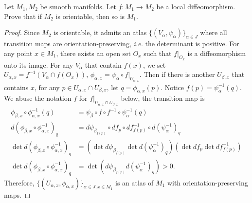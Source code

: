 \documentclass[12pt]{article}
\begin{document}
\begin{problem}[do Carmo 0.8]
Let $ M_1,M_2$ be smooth manifolds. Let $ f: M_1 \to M_2$ be a local diffeomorphism. Prove that if $ M_2$ is orientable, then so is $ M_1$.
\end{problem}
\begin{proof}
Since $ M_2$ is orientable, it admits an atlas $ \{(V_{ \alpha},\psi_{ \alpha})\}_{ \alpha \in J} $ where all transition maps are orientation-preserving, \emph{i.e.} the determinant is positive. For any point $x \in M_1$, there exists an open set $ O_x$  such that  $ f|_{O_x}$ is a diffeomorphism onto its image. For any $ V_{ \alpha}$ that contain $ f(x)$, we set $ U_{ \alpha,x} = f ^{-1}(V_{ \alpha} \cap f(O_x))$, $ \phi_{ \alpha,x} = \psi_{ \alpha} \circ f|_{U_{ \alpha,x}}$. Then if there is another $ U_{ \beta,x}$ that contains $ x$, for any $ p \in U_{ \alpha,x} \cap U_{ \beta,x}$, let $ q = \phi_{ \alpha,x}(p)$. Notice $ f(p) = \psi_{ \alpha}^{-1}(q)$. We abuse the notation $ f$ for  $ f|_{U_{ \alpha,x} \cap U_{ \beta,x}}$ below, the transition map is
\begin{align*}
	\phi_{ \beta,x} \circ \phi_{ \alpha,x}^{-1}(q) &= \psi_{ \beta} \circ f \circ f^{-1} \circ \psi_{ \alpha}^{-1}(q) \\
	d(\phi_{ \beta,x} \circ \phi_{ \alpha,x}^{-1})_q &= d \psi_{ \beta}_{ f(p)} \circ df_p \circ df^{-1}_{f(p)} \circ d (\psi_{ \alpha}^{-1})_q \\
\det d(\phi_{ \beta,x} \circ \phi_{ \alpha,x}^{-1})_q &= \left( \det  d \psi_{ \beta}_{f(p)} \det  d (\psi_{ \alpha}^{-1})_q \right) \left(\det  df_p \det  df^{-1}_{f(p)} \right) \\
\det d(\phi_{ \beta,x} \circ \phi_{ \alpha,x}^{-1})_q &= \det \left( d \psi_{ \beta}_{f(p)} d (\psi_{ \alpha}^{-1})_q \right) > 0.
\end{align*}
Therefore, $ \{(U_{ \alpha, x}, \phi_{ \alpha,x})\}_{ \alpha \in J, x \in M_1} $ is an atlas of $ M_1$ with orientation-preserving maps.
\end{proof}
\end{document}
